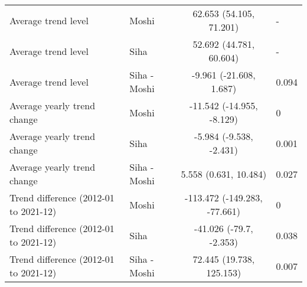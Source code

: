 \begin{longtable}{l|lcl}
\midrule\addlinespace[2.5pt]
\multicolumn{4}{l}{Malnutrition} \\ 
\midrule\addlinespace[2.5pt]
Average trend level & Moshi & 62.653 (54.105, 71.201) & - \\ 
Average trend level & Siha & 52.692 (44.781, 60.604) & - \\ 
Average trend level & Siha - Moshi & -9.961 (-21.608, 1.687) & 0.094 \\ 
Average yearly trend change & Moshi & -11.542 (-14.955, -8.129) & 0 \\ 
Average yearly trend change & Siha & -5.984 (-9.538, -2.431) & 0.001 \\ 
Average yearly trend change & Siha - Moshi & 5.558 (0.631, 10.484) & 0.027 \\ 
Trend difference (2012-01 to 2021-12) & Moshi & -113.472 (-149.283, -77.661) & 0 \\ 
Trend difference (2012-01 to 2021-12) & Siha & -41.026 (-79.7, -2.353) & 0.038 \\ 
Trend difference (2012-01 to 2021-12) & Siha - Moshi & 72.445 (19.738, 125.153) & 0.007 \\ 
\bottomrule
\end{longtable}

